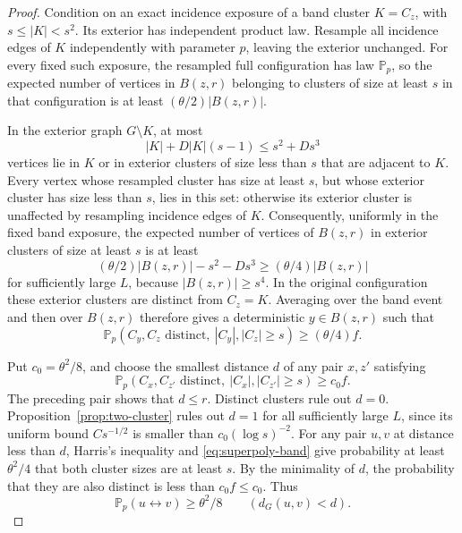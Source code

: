\documentclass[11pt]{article}
\theoremstyle{definition}
\newcommand{\PP}{\mathbb P}
\begin{document}
\begin{proof}
Condition on an exact incidence exposure of a band cluster
$K=C_z$, with $s\le|K|<s^2$. Its exterior has independent product law.
Resample all incidence edges of $K$ independently with parameter $p$,
leaving the exterior unchanged. For every fixed such exposure, the
resampled full configuration has law $\PP_p$, so the expected number
of vertices in $B(z,r)$ belonging to clusters of size at least $s$
in that configuration is at least
$(\theta/2)|B(z,r)|$.

In the exterior graph $G\setminus K$, at most
\[
 |K|+D|K|(s-1)\le s^2+Ds^3
\]
vertices lie in $K$ or in exterior clusters of size less than $s$
that are adjacent to $K$. Every vertex whose resampled cluster has
size at least $s$, but whose exterior cluster has size less than $s$,
lies in this set: otherwise its exterior cluster is unaffected by
resampling incidence edges of $K$. Consequently, uniformly in the
fixed band exposure, the expected number of vertices of $B(z,r)$
in exterior clusters of size at least $s$ is at least
\[
 (\theta/2)|B(z,r)|-s^2-Ds^3
 \ge(\theta/4)|B(z,r)|
\]
for sufficiently large $L$, because $|B(z,r)|\ge s^4$.
In the original configuration these exterior clusters are distinct
from $C_z=K$. Averaging over the band event and then over $B(z,r)$
therefore gives a deterministic $y\in B(z,r)$ such that
\[
 \PP_p(C_y,C_z\text{ distinct},\ |C_y|,|C_z|\ge s)
 \ge(\theta/4)f.
\]

Put $c_0=\theta^2/8$, and choose the smallest distance $d$ of any pair
$x,z'$ satisfying
\begin{equation}\label{eq:superpoly-separated-pair}
 \PP_p(C_x,C_{z'}\text{ distinct},\ |C_x|,|C_{z'}|\ge s)
 \ge c_0 f.
\end{equation}
The preceding pair shows that $d\le r$. Distinct clusters rule out
$d=0$. Proposition~\ref{prop:two-cluster} rules out $d=1$ for all
sufficiently large $L$, since its uniform bound $Cs^{-1/2}$ is smaller
than $c_0(\log s)^{-2}$.
For any pair $u,v$ at distance less than $d$, Harris's inequality and
\eqref{eq:superpoly-band} give probability at least $\theta^2/4$ that
both cluster sizes are at least $s$. By the minimality of $d$, the
probability that they are also distinct is less than $c_0f\le c_0$.
Thus
\begin{equation}\label{eq:superpoly-short-connections}
 \PP_p(u\leftrightarrow v)\ge\theta^2/8
 \qquad(d_G(u,v)<d).
\end{equation}


\end{proof}
\end{document}
